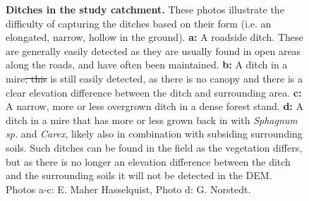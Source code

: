 \documentclass[11pt, review]{elsarticle} %
\providecommand{\DIFaddtex}[1]{{\protect\color{blue}\uwave{#1}}} %
\providecommand{\DIFdeltex}[1]{{\protect\color{red}\sout{#1}}}                      %
\providecommand{\DIFaddFL}[1]{\DIFadd{#1}} %
\providecommand{\DIFdelFL}[1]{\DIFdel{#1}} %
\providecommand{\DIFaddbeginFL}{} %
\providecommand{\DIFaddendFL}{} %
\providecommand{\DIFdelbeginFL}{} %
\providecommand{\DIFdelendFL}{} %
\providecommand{\DIFadd}[1]{\texorpdfstring{\DIFaddtex{#1}}{#1}} %
\providecommand{\DIFdel}[1]{\texorpdfstring{\DIFdeltex{#1}}{}} %
\begin{document}
\begin{figure} [!htb]
    \caption{\textbf{Ditches in the study catchment.} These photos illustrate the difficulty of capturing the ditches based on their form (i.e. an elongated, narrow, hollow in the ground). \textbf{a: }A roadside ditch. These are generally easily detected as they are usually found in open areas along the roads, and have often been maintained. \textbf{b: }A ditch in a mire\DIFdelbeginFL \DIFdelFL{; this }\DIFdelendFL \DIFaddbeginFL \DIFaddFL{. This }\DIFaddendFL is still easily detected, as there is no canopy and there is a clear elevation difference between the ditch and surrounding area. \textbf{c: }A narrow, more or less  overgrown ditch in a dense forest stand. \textbf{d: }A ditch in a mire that has more or less grown back in with \textit{Sphagnum sp.} and \textit{Carex}, likely also in combination with subsiding surrounding soils. Such ditches can be found in the field as the vegetation differs, but as there is no longer an elevation difference between the ditch and the surrounding soils it will not be detected in the DEM. \newline Photos a-c: E. Maher Hasselquist, Photo d: G. Norstedt.}
    \label{fig:ditchpictures}
\end{figure}
\clearpage
\end{document}
